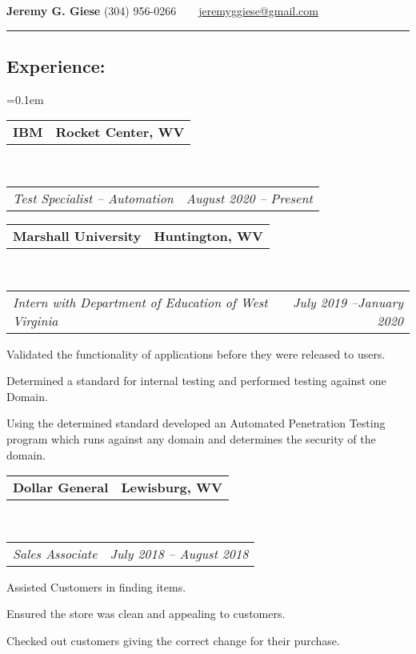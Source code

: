 \documentclass[11pt,letterpaper]{article}
\makeatletter
\newcommand{\headerrow}[2]
{\begin{tabular*}{\linewidth}{l@{\extracolsep{\fill}}r}
	#1 &
	#2 \\
\end{tabular*}}
\makeatother
\begin{document}
\begin{center}
{\LARGE \textbf{Jeremy G. Giese}}
\bigbreak
(304) 956-0266\smallbreak\ \ 
\ \ \href{mailto:jeremyggiese@gmail.com}{jeremyggiese@gmail.com}\\
\end{center}

\hrule
\vspace{-0.4em}
\subsection*{\Large{Experience:}}

	\parskip=0.1em

	\headerrow
		{\textbf{IBM}}
		{\textbf{Rocket Center, WV}}
	\\
	\headerrow
		{\hspace{0.5cm}\emph{Test Specialist – Automation}}
		{\emph{August 2020 -- Present}}
			
	\headerrow
		{\hspace{-0.5cm}\textbf{Marshall University}}
		{\textbf{Huntington, WV}}
	\\
	\headerrow
		{\hspace{0.5cm}\emph{Intern with Department of Education of West Virginia}}
		{\emph{July 2019 --January 2020}}
	\begin{itemize*}
		\item Validated the functionality of applications before they were released to users.
		\item Determined a standard for internal testing and performed testing against one Domain.
		\item Using the determined standard developed an Automated Penetration Testing program which runs against any domain and determines the security of the domain.
		\end{itemize*}

	\headerrow
		{\hspace{-0.5cm}\textbf{Dollar General}}
		{\textbf{Lewisburg, WV}}
	\\
	\headerrow
		{\hspace{0.5cm}\emph{Sales Associate}}
		{\emph{July 2018 -- August 2018}}
	\begin{itemize*}
		\item Assisted Customers in finding items.
		\item Ensured the store was clean and appealing to customers.
		\item Checked out customers giving the correct change for their purchase.
	\end{itemize*}
\end{document}
